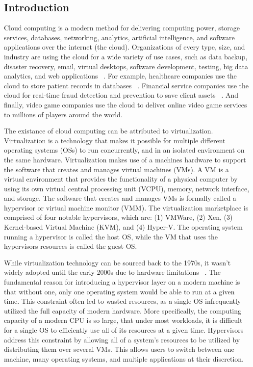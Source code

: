 \documentclass{report}
\begin{document}
\begin{spacing}{1.5}


\newpage
\chapter{Introduction}


{\large
Cloud computing is a modern method for delivering computing power, storage services, databases, networking, analytics, artificial intelligence, and software applications over the internet (the cloud). Organizations of every type, size, and industry are using the cloud for a wide variety of use cases, such as data backup, disaster recovery, email, virtual desktops, software development, testing, big data analytics, and web applications ~\cite{BELLO2021103441}. For example, healthcare companies use the cloud to store patient records in databases ~\cite{BELLO2021103441}. Financial service companies use the cloud for real-time fraud detection and prevention to save client assets ~\cite{BELLO2021103441}. And finally, video game companies use the cloud to deliver online video game services to millions of players around the world.
\newline
}

{\large
The existance of cloud computing can be attributed to virtualization. Virtualization is a technology that makes it possible for multiple different operating systems (OSs) to run concurrently, and in an isolated environment on the same hardware. Virtualization makes use of a machines hardware to support the software that creates and manages virtual machines (VMs). A VM is a virtual environment that provides the functionality of a physical computer by using its own virtual central processing unit (VCPU), memory, network interface, and storage. The software that creates and manages VMs is formally called a hypervisor or virtual machine monitor (VMM). The virtualization marketplace is comprised of four notable hypervisors, which are: (1) VMWare, (2) Xen, (3) Kernel-based Virtual Machine (KVM), and (4) Hyper-V. The operating system running a hypervisor is called the host OS, while the VM that uses the hypervisors resources is called the guest OS.
\newline
}

{\large
While virtualization technology can be sourced back to the 1970s, it wasn’t widely adopted until the early 2000s due to hardware limitations ~\cite{popek1974formal}. The fundamental reason for introducing a hypervisor layer on a modern machine is that without one, only one operating system would be able to run at a given time. This constraint often led to wasted resources, as a single OS infrequently utilized the full capacity of modern hardware. More specifically, the computing capacity of a modern CPU is so large, that under most workloads, it is difficult for a single OS to efficiently use all of its resources at a given time. Hypervisors address this constraint by allowing all of a system’s resources to be utilized by distributing them over several VMs. This allows users to switch between one machine, many operating systems, and multiple applications at their discretion.
\newline
}




\end{spacing}
\end{document}
